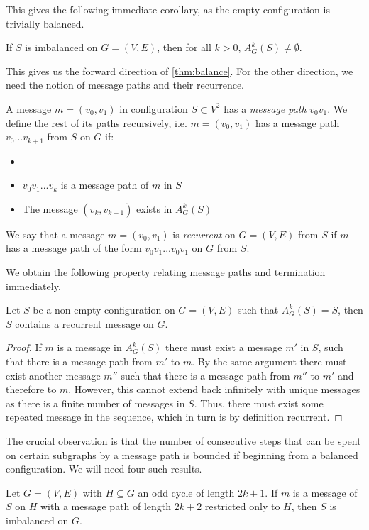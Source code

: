     This gives the following immediate corollary, as the empty configuration is trivially balanced.
    \begin{corollary}
    \label{corr: Forward}
        If $S$ is imbalanced on $G=(V,E)$, then for all $k>0$, $A^k_G(S)\neq\emptyset$.
    \end{corollary}
    This gives us the forward direction of \cref{thm:balance}. For the other direction, we need the notion of message paths and their recurrence.
    \begin{definition}
    \label{def: message paths}
    A message $m=(v_0,v_1)$ in configuration $S\subset V^2$ has a \emph{message path} $v_0v_1$.
    We define the rest of its paths recursively, i.e. $m=(v_0,v_1)$ has a message path $v_0...v_{k+1}$ from $S$ on $G$ if:
    \begin{itemize}
    \item 
        \item $v_0v_1...v_{k}$ is a message path of $m$ in $S$
        \item The message $(v_k,v_{k+1})$ exists in $A_G^k(S)$
    \end{itemize}
     We say that a message $m=(v_0,v_1)$ is \emph{recurrent} on $G=(V,E)$ from $S$ if $m$ has a message path of the form $v_0v_1...v_0v_1$ on $G$ from $S$.
    \end{definition}
    We obtain the following property relating message paths and termination immediately.
    \begin{lemma}
    \label{lemma: recurrence}
        Let $S$ be a non-empty configuration on $G=(V,E)$ such that $A_{G}^k(S)=S$, then $S$ contains a recurrent message on $G$.
    \end{lemma}
    \begin{proof}
        If $m$ is a message in $A_{G}^k(S)$ there must exist a message $m'$ in $S$, such that there is a message path from $m'$ to $m$. By the same argument there must exist another message $m''$ such that there is a message path from $m''$ to $m'$ and therefore to $m$. However, this cannot extend back infinitely with unique messages as there is a finite number of messages in $S$. Thus, there must exist some repeated message in the sequence, which in turn is by definition recurrent.
    \end{proof}
    The crucial observation is that the number of consecutive steps that can be spent on certain subgraphs by a message path is bounded if beginning from a balanced configuration. We will need four such results.
    \begin{lemma}
    Let $G=(V,E)$ with $H \subseteq G$ an odd cycle of length $2k+1$. If $m$ is a message of $S$ on $H$ with a message path of length $2k+2$ restricted only to $H$, then $S$ is imbalanced on $G$.
        \label{lemma: odd cycles}
\end{lemma}
